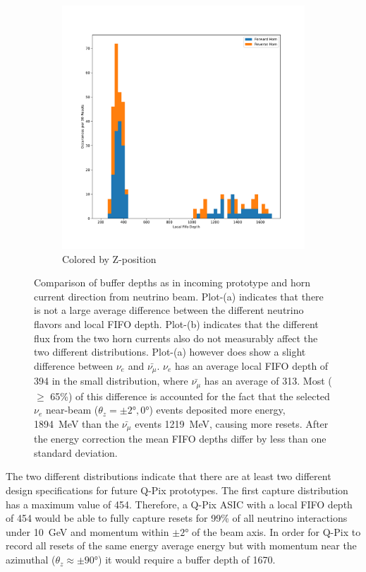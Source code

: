\begin{figure}
\begin{subfigure}{.5\textwidth}
  \includegraphics[width=\textwidth]{images/df_horn_cut.pdf}
  \caption{Colored by Z-position}
\end{subfigure}
\caption{Comparison of buffer depths as in incoming prototype and horn current direction from neutrino beam.
Plot-(a) indicates that there is not a large average difference between the different neutrino flavors and local FIFO depth.
Plot-(b) indicates that the different flux from the two horn currents also do not measurably affect the two different distributions.
Plot-(a) however does show a slight difference between $\nu_{e}$ and $\bar{\nu_{\mu}}$.
$\nu_{e}$ has an average local FIFO depth of 394 in the small distribution, where $\bar{\nu_{\mu}}$ has an average of 313.
Most ($\geq $ 65\%) of this difference is accounted for the fact that the selected $\nu_{e}$ near-beam ($\theta_{z} = \pm 2\unit{\degree}, 0\unit{\degree}$) events deposited more energy, 1894~\unit{MeV} than the $\bar{\nu_{\mu}}$ events 1219~\unit{MeV}, causing more resets.
After the energy correction the mean FIFO depths differ by less than one standard deviation.
}
\label{fig:compare_integral_pdg}
\end{figure}

The two different distributions indicate that there are at least two different design specifications for future Q-Pix prototypes.
The first capture distribution has a maximum value of 454.
Therefore, a Q-Pix ASIC with a local FIFO depth of 454 would be able to fully capture resets for 99\% of all neutrino interactions under 10~\unit{GeV} and momentum within $\pm 2\unit{\degree}$ of the beam axis.
In order for Q-Pix to record all resets of the same energy average energy but with momentum near the azimuthal ($\theta_{z} \approx \pm 90$\unit{\degree}) it would require a buffer depth of 1670.

